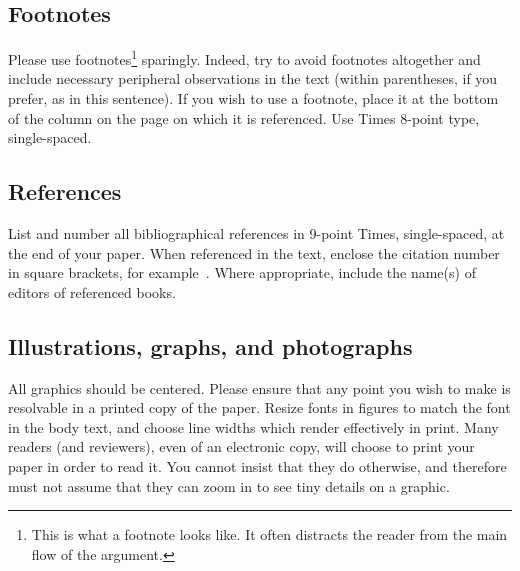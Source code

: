 \subsection{Footnotes}
Please use footnotes\footnote {This is what a footnote looks like.  It
often distracts the reader from the main flow of the argument.} sparingly.
Indeed, try to avoid footnotes altogether and include necessary peripheral
observations in
the text (within parentheses, if you prefer, as in this sentence).  If you
wish to use a footnote, place it at the bottom of the column on the page on
which it is referenced. Use Times 8-point type, single-spaced.
\subsection{References}
List and number all bibliographical references in 9-point Times,
single-spaced, at the end of your paper. When referenced in the text,
enclose the citation number in square brackets, for
example~\cite{Authors14}.  Where appropriate, include the name(s) of
editors of referenced books.
\subsection{Illustrations, graphs, and photographs}
All graphics should be centered.  Please ensure that any point you wish to
make is resolvable in a printed copy of the paper.  Resize fonts in figures
to match the font in the body text, and choose line widths which render
effectively in print.  Many readers (and reviewers), even of an electronic
copy, will choose to print your paper in order to read it.  You cannot
insist that they do otherwise, and therefore must not assume that they can
zoom in to see tiny details on a graphic.


